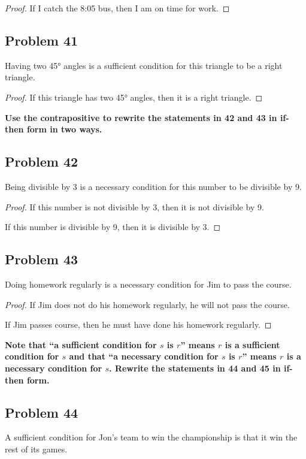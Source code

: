 \documentclass[14pt]{extarticle}
\begin{document}
\begin{proof}
If I catch the 8:05 bus, then I am on time for work.
\end{proof}

\subsection{Problem 41}
Having two 45° angles is a sufficient condition for this triangle to be a right triangle.

\begin{proof}
If this triangle has two 45° angles, then it is a right triangle.
\end{proof}

{\bf Use the contrapositive to rewrite the statements in 42 and 43 in if-then form in two ways.}

\subsection{Problem 42}
Being divisible by 3 is a necessary condition for this number to be divisible by 9.

\begin{proof}
If this number is not divisible by 3, then it is not
divisible by 9.

If this number is divisible by 9, then it is divisible by 3.
\end{proof}

\subsection{Problem 43}
Doing homework regularly is a necessary condition for Jim to pass the course.

\begin{proof}
If Jim does not do his homework regularly, he will not pass the course.

If Jim passes course, then he must have done his homework regularly.
\end{proof}

{\bf Note that “a sufficient condition for $s$ is $r$” means $r$
is a sufficient condition for $s$ and that “a necessary condition for $s$ is $r$” means $r$ is a necessary condition for $s$. Rewrite the statements in 44 and 45 in if-then form.}

\subsection{Problem 44}
A sufficient condition for Jon’s team to win the championship is that it win the rest of its games.
\end{document}
